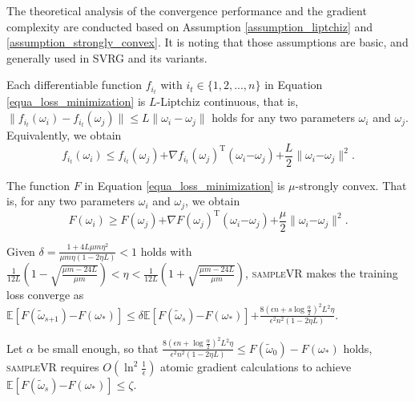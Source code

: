 \documentclass[letterpaper]{article}
\begin{document}
The theoretical analysis of the convergence performance and the gradient complexity are conducted based on  Assumption \ref{assumption_liptchiz} and \ref{assumption_strongly_convex}. It is noting that those assumptions are basic, and generally used in SVRG and its variants.

\begin{Assumption}
\label{assumption_liptchiz}
Each  differentiable function $f_{i_t}$ with $i_t\in\{1,2, ..., n\}$ in Equation \ref{equa_loss_minimization} is $L$-Liptchiz continuous, that is,  $\parallel  f_{i_t}(\omega_i) - f_{i_t}(\omega_j)  \parallel \le L \parallel \omega_i - \omega_j    \parallel$ holds for any two parameters $\omega_i$ and $\omega_j$. Equivalently, we obtain
$$
f_{i_t}(\omega_i)\le f_{i_t}(\omega_j)\mathrm{+}\nabla f_{i_t}(\omega_j)^\mathrm{T} (\omega_i\mathrm{-}\omega_j)\mathrm{+}\frac{L}{2}\parallel \omega_i\mathrm{-}\omega_j\parallel^2.
$$
\end{Assumption}

\begin{Assumption}
\label{assumption_strongly_convex}
The function $F$ in Equation \ref{equa_loss_minimization} is $\mu$-strongly convex. That is, for any two parameters $\omega_i$ and $\omega_j$, we obtain
$$
F(\omega_i)\ge F(\omega_j)\mathrm{+}\nabla F(\omega_j)^\mathrm{T} (\omega_i\mathrm{-}\omega_j)\mathrm{+}\frac{\mu}{2}\parallel \omega_i\mathrm{-}\omega_j\parallel^2.
$$
\end{Assumption}

\begin{Theorem}
\label{Theorem_converge}
Given $\delta=\frac{1+4L\mu m \eta^2}{  \mu m \eta (1-2\eta L)  } < 1$ holds with $\frac{1}{12L}\left( 1- \sqrt{\frac{\mu m - 24L}{\mu m}} \right) \mathrm{<} \eta \mathrm{<} \frac{1}{12L}\left( 1+ \sqrt{\frac{\mu m - 24L}{\mu m}} \right)$, \textsc{sampleVR} makes the training loss converge as
$\mathbb{E}[F(\tilde{\omega}_{s\mathrm{+}1}) \mathrm{-} F(\omega_\ast)]  \mathrm{\le} \delta \mathbb{E}[F(\tilde{\omega}_s)\mathrm{-}F(\omega_\ast)] \mathrm{+} \frac{8(\epsilon n+s\log\frac{\alpha}{2})^2L^2\eta}{\epsilon^2n^2(1-2\eta L)}$.
\end{Theorem}

\begin{Theorem}
\label{theorem_gradient_complexity}
Let $\alpha$ be small enough, so that $\frac{8(\epsilon n+\log\frac{\alpha}{2})^2L^2\eta}{\epsilon^2n^2(1-2\eta L)}\le F(\tilde{\omega}_0) - F(\omega_\ast)$ holds, \textsc{sampleVR} requires $O(\ln^2\frac{1}{\epsilon})$ atomic gradient calculations  to achieve $\mathbb{E}[F(\tilde{\omega}_s)\mathrm{-}F(\omega_\ast)] \le \zeta$.
\end{Theorem}
\end{document}
